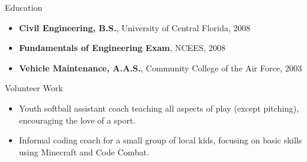 \documentclass[]{mcdowellcv}
\begin{document}
	\begin{cvsection}{Education}
		\begin{cvsubsection}{}{}{}
			\begin{itemize}
				\item \textbf{Civil Engineering, B.S.}, University of Central Florida, 2008
				\item \textbf{Fundamentals of Engineering Exam}, NCEES, 2008
				\item \textbf{Vehicle Maintenance, A.A.S.}, Community College of the Air Force, 2003
			\end{itemize}
		\end{cvsubsection}
	\end{cvsection}
	\begin{cvsection}{Volunteer Work}
		\begin{cvsubsection}{}{}{}
			\begin{itemize}
				\item Youth softball assistant coach teaching all aspects of play (except pitching),  encouraging the love of a sport.
				\item Informal coding coach for a small group of local kids, focusing on basic skills using Minecraft and Code Combat.
			\end{itemize}
		\end{cvsubsection}
	\end{cvsection}
\end{document}
